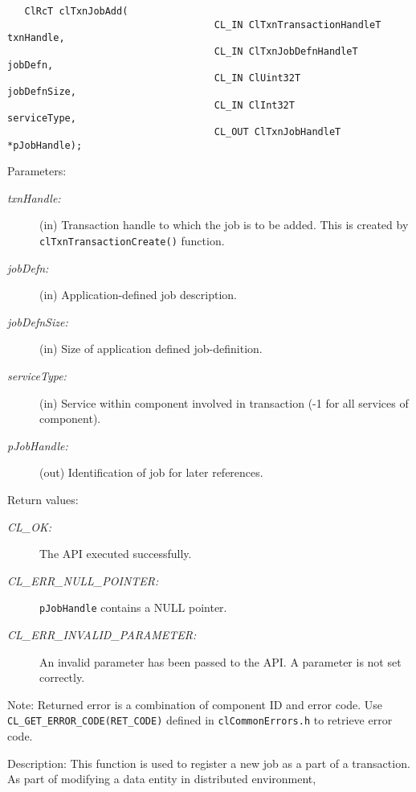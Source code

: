 \begin{flushleft}
\begin{Desc}
\footnotesize\begin{verbatim}   ClRcT clTxnJobAdd(
                              		CL_IN ClTxnTransactionHandleT      txnHandle,
                              		CL_IN ClTxnJobDefnHandleT  jobDefn,
                              		CL_IN ClUint32T             jobDefnSize,
                              		CL_IN ClInt32T              serviceType,
                              		CL_OUT ClTxnJobHandleT      *pJobHandle);
\end{verbatim}
\normalsize
\end{Desc}
\begin{Desc}
\item[Parameters:]
\begin{description}
\item[{\em txn\-Handle:}](in) Transaction handle to which the job is to be added. This is created by {\tt{clTxnTransactionCreate()}} function. 
\item[{\em job\-Defn:}](in) Application-defined job description. 
\item[{\em job\-Defn\-Size:}](in) Size of application defined job-definition. 
\item[{\em service\-Type:}](in) Service within component involved in transaction (-1 for all services of component). 
\item[{\em p\-Job\-Handle:}](out) Identification of job for later references.\end{description}
\end{Desc}
\begin{Desc}
\item[Return values:]
\begin{description}
\item[{\em CL\_\-OK:}]The API executed successfully. \item[{\em CL\_\-ERR\_\-NULL\_\-POINTER:}]{\tt{pJobHandle}} contains a NULL pointer. 
\item[{\em CL\_\-ERR\_\-INVALID\_\-PARAMETER:}]An invalid parameter has been passed to the API. A parameter is not set correctly.\end{description}
\end{Desc}
\begin{Desc}
\item[Note:]Returned error is a combination of component ID and error code. Use {\tt{CL\_\-GET\_\-ERROR\_\-CODE(RET\_\-CODE)}} defined in 
{\tt{clCommonErrors.h}} to retrieve error code.\end{Desc}
\begin{Desc}
\item[Description:]This function is used to register a new job as a part of a transaction. As part of modifying a data entity in distributed environment, 

\end{Desc}
\end{flushleft}

